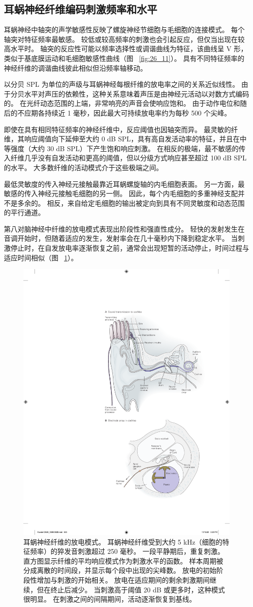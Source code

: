 \subsection{耳蜗神经纤维编码刺激频率和水平}

耳蜗神经中轴突的声学敏感性反映了螺旋神经节细胞与毛细胞的连接模式。
每个轴突对特征频率最敏感。
较低或较高频率的刺激也会引起反应，但仅当出现在较高水平时。
轴突的反应性可能以频率选择性或调谐曲线为特征，该曲线呈 V 形，类似于基底膜运动和毛细胞敏感性曲线（图 ~\ref{fig:26_11}）。
具有不同特征频率的神经纤维的调谐曲线彼此相似但沿频率轴移动。


以分贝 SPL 为单位的声级与耳蜗神经每根纤维的放电率之间的关系近似线性。
由于分贝水平对声压的依赖性，这种关系意味着声压是由神经元活动以对数方式编码的。
在光纤动态范围的上端，非常响亮的声音会使响应饱和。
由于动作电位和随后的不应期各持续近 1 毫秒，因此最大可持续放电率约为每秒 500 个尖峰。


即使在具有相同特征频率的神经纤维中，反应阈值也因轴突而异。 最灵敏的纤维，其响应阈值向下延伸至大约 0 dB SPL，具有高自发活动率的特征，并且在中等强度（大约 30 dB SPL）下产生饱和响应刺激。
在相反的极端，最不敏感的传入纤维几乎没有自发活动和更高的阈值，但以分级方式响应甚至超过 100 dB SPL 的水平。
大多数纤维的活动模式介于这些极端之间。


最低灵敏度的传入神经元接触最靠近耳蜗螺旋轴的内毛细胞表面。
另一方面，最敏感的传入神经元接触毛细胞的另一侧。
因此，每个内毛细胞的多重神经支配并不是多余的。
相反，来自给定毛细胞的输出被定向到具有不同灵敏度和动态范围的平行通道。


第八对脑神经中纤维的放电模式表现出阶段性和强直性成分。
轻快的发射发生在音调开始时，但随着适应的发生，发射率会在几十毫秒内下降到稳定水平。
当刺激停止时，在自发放电率逐渐恢复之前，通常会出现短暂的活动停止，时间过程与适应时间相似（图 ~\ref{fig:26_18}）。


\begin{figure}[htbp]
	\centering
	\includegraphics[width=0.5\linewidth]{chap26/fig_26_18}
	\caption{耳蜗神经纤维的放电模式。
		耳蜗神经纤维受到大约 5 kHz（细胞的特征频率）的猝发音刺激超过 250 毫秒。
		一段平静期后，重复刺激。
		直方图显示纤维的平均响应模式作为刺激水平的函数。
		样本周期被分成离散的时间段，并显示每个段中出现的尖峰数。
		放电的初始阶段性增加与刺激的开始相关。
		放电在适应期间的剩余刺激期间继续，但在终止后减少。
		当刺激高于阈值 20 dB 或更多时，这种模式很明显。
		在刺激之间的间隔期间，活动逐渐恢复到基线\cite{kiang1965discharge}。}
	\label{fig:26_18}
\end{figure}


